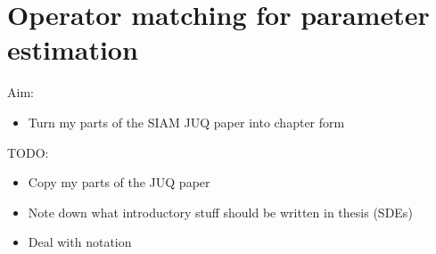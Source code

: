 \documentclass[main.tex]{subfiles}
\begin{document}
\chapter{Operator matching for parameter estimation}\label{ch:koopestim}


Aim:
\begin{itemize}
\item Turn my parts of the SIAM JUQ paper into chapter form
\end{itemize}

TODO:
\begin{itemize}
\item Copy my parts of the JUQ paper
\item Note down what introductory stuff should be written in thesis (SDEs)
\item Deal with notation
\end{itemize}

\biblio{} %
\end{document}
